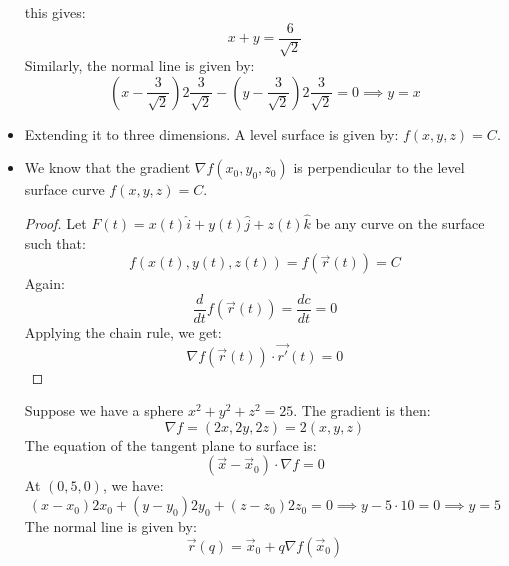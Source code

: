 \begin{itemize}
\begin{example}
\begin{equation}
        \end{equation}
        this gives:
        \begin{equation}
            x+y=\frac{6}{\sqrt{2}}
        \end{equation}
        Similarly, the normal line is given by:
        \begin{equation}
            \left(x-\frac{3}{\sqrt{2}}\right)2\frac{3}{\sqrt{2}}-\left(y-\frac{3}{\sqrt{2}}\right)2\frac{3}{\sqrt{2}} = 0 \implies y=x
        \end{equation}
    \end{example}
    \item Extending it to three dimensions. A level surface is given by: $f(x,y,z)=C$. 
    \item We know that the gradient $\nabla f(x_0,y_0,z_0)$ is perpendicular to the level surface curve $f(x,y,z)=C$.
    \begin{proof}
        Let $F(t)=x(t)\hat{i}+y(t)\hat{j}+z(t)\hat{k}$ be any curve on the surface such that:
    \begin{equation}
        f(x(t), y(t), z(t)) = f(\vec{r}(t)) = C
    \end{equation}
    Again:
    \begin{equation}
        \frac{d}{dt} f(\vec{r}(t)) = \frac{dc}{dt}=0
    \end{equation}
    Applying the chain rule, we get:
    \begin{equation}
        \nabla f(\vec{r}(t)) \cdot \vec{r'}(t)=0
    \end{equation}
    \end{proof}
    \begin{example}
        Suppose we have a sphere $x^2+y^2+z^2=25$. The gradient is then:
        \begin{equation}
            \nabla f = (2x,2y,2z)=2(x,y,z)
        \end{equation}
        The equation of the tangent plane to surface is:
        \begin{equation}
            (\vec{x}-\vec{x}_0)\cdot \nabla f = 0
        \end{equation}
        At $(0,5,0)$, we have:
        \begin{equation}
            (x-x_0)2x_0 + (y-y_0)2y_0+(z-z_0)2z_0 = 0 \implies y-5\cdot 10=0 \implies y=5
        \end{equation}
        The normal line is given by:
        \begin{equation}
            \vec{r}(q)=\vec{x}_0+q\nabla f(\vec{x}_0)

\end{equation}
\end{example}
\end{itemize}
